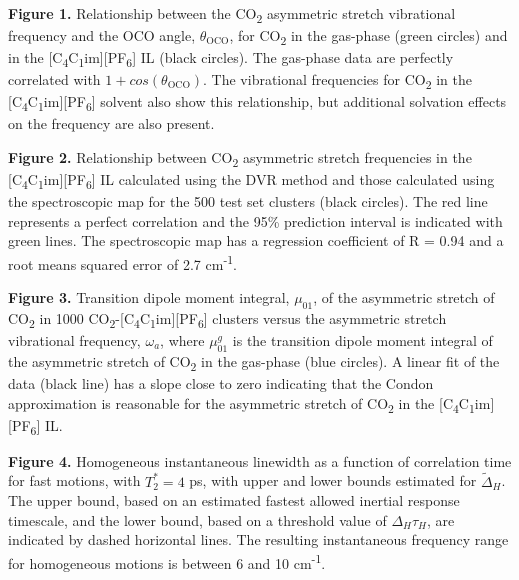\documentclass[]{article}
\begin{document}
\emph{\\
}


\textbf{Figure 1.} Relationship between the CO\textsubscript{2}
asymmetric stretch vibrational frequency and the OCO angle,
\(\theta_{\text{OCO}}\), for CO\textsubscript{2} in the gas-phase (green
circles) and in the
{[}C\textsubscript{4}C\textsubscript{1}im{]}{[}PF\textsubscript{6}{]} IL
(black circles). The gas-phase data are perfectly correlated with
\(1 + cos(\theta_{\text{OCO}})\). The vibrational frequencies for
CO\textsubscript{2} in the
{[}C\textsubscript{4}C\textsubscript{1}im{]}{[}PF\textsubscript{6}{]}
solvent also show this relationship, but additional solvation effects on
the frequency are also present.


\textbf{Figure 2.} Relationship between CO\textsubscript{2} asymmetric
stretch frequencies in the
{[}C\textsubscript{4}C\textsubscript{1}im{]}{[}PF\textsubscript{6}{]} IL
calculated using the DVR method and those calculated using the
spectroscopic map for the 500 test set clusters (black circles). The red
line represents a perfect correlation and the 95\% prediction interval
is indicated with green lines. The spectroscopic map has a regression
coefficient of R = 0.94 and a root means squared error of 2.7
cm\textsuperscript{-1}.


\textbf{Figure 3.} Transition dipole moment integral, \(\mu_{01}\), of
the asymmetric stretch of CO\textsubscript{2} in 1000
CO\textsubscript{2}-{[}C\textsubscript{4}C\textsubscript{1}im{]}{[}PF\textsubscript{6}{]}
clusters versus the asymmetric stretch vibrational frequency,
\(\omega_{a}\), where \(\mu_{01}^{g}\) is the transition dipole moment
integral of the asymmetric stretch of CO\textsubscript{2} in the
gas-phase (blue circles). A linear fit of the data (black line) has a
slope close to zero indicating that the Condon approximation is
reasonable for the asymmetric stretch of CO\textsubscript{2} in the
{[}C\textsubscript{4}C\textsubscript{1}im{]}{[}PF\textsubscript{6}{]}
IL.


\textbf{Figure 4.} Homogeneous instantaneous linewidth as a function of
correlation time for fast motions, with \(T_{2}^{*} = 4\) ps, with upper
and lower bounds estimated for \({\widetilde{\Delta}}_{H}\). The upper
bound, based on an estimated fastest allowed inertial response
timescale, and the lower bound, based on a threshold value of
\(\Delta_{H}\tau_{H}\), are indicated by dashed horizontal lines. The
resulting instantaneous frequency range for homogeneous motions is
between 6 and 10 cm\textsuperscript{-1}.
\end{document}
